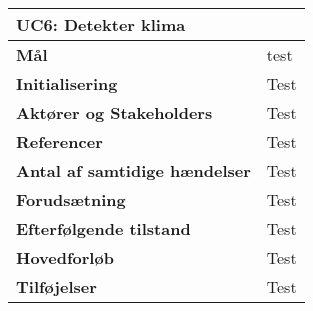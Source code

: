 \begin{table}[H] \centering
\begin{tabular}{|p{6cm}|p{8cm}|}
	\hline
\multicolumn{2}{|l|}{\textbf{UC6: Detekter klima}} \\\hline
\textbf{Mål}								&test \\\hline
\textbf{Initialisering}					&Test \\\hline
\textbf{Aktører og Stakeholders}			&Test \\\hline
\textbf{Referencer}						&Test \\\hline
\textbf{Antal af samtidige hændelser}	&Test \\\hline
\textbf{Forudsætning}					&Test \\\hline
\textbf{Efterfølgende tilstand}			&Test \\\hline
\textbf{Hovedforløb}						&Test \\\hline
\textbf{Tilføjelser}						&Test \\\hline
	\end{tabular}
	\label{UC6} 
\end{table}
